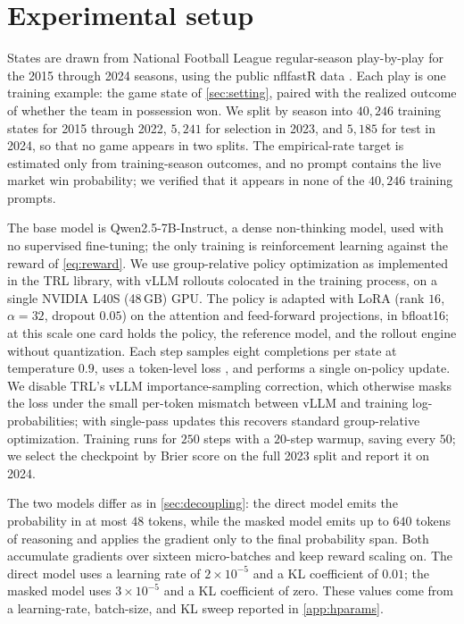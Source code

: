 \section{Experimental setup}
\label{sec:setup}

States are drawn from National Football League regular-season play-by-play for the 2015 through 2024
seasons, using the public nflfastR data \citep{yurko2018, nflfastr}. Each play is one training
example: the game state of \cref{sec:setting}, paired with the realized outcome of whether the team in
possession won. We split by season into $40{,}246$ training states for 2015 through 2022,
$5{,}241$ for selection in 2023, and $5{,}185$ for test in 2024, so that no game appears in two splits.
The empirical-rate target is estimated only from training-season outcomes, and no prompt contains the
live market win probability; we verified that it appears in none of the $40{,}246$ training prompts.

The base model is Qwen2.5-7B-Instruct, a dense non-thinking model, used with no supervised fine-tuning;
the only training is reinforcement learning against the reward of \cref{eq:reward}. We use group-relative
policy optimization \citep{grpo} as implemented in the TRL library, with vLLM rollouts colocated in the
training process, on a single NVIDIA L40S (48\,GB) GPU. The policy is adapted with LoRA (rank $16$,
$\alpha=32$, dropout $0.05$) on the attention and feed-forward projections, in bfloat16; at this scale one
card holds the policy, the reference model, and the rollout engine without quantization. Each step
samples eight completions per state at temperature $0.9$, uses a token-level loss \citep{dapo}, and
performs a single on-policy update. We disable TRL's vLLM importance-sampling correction, which otherwise
masks the loss under the small per-token mismatch between vLLM and training log-probabilities; with
single-pass updates this recovers standard group-relative optimization. Training runs for $250$ steps
with a $20$-step warmup, saving every $50$; we select the checkpoint by Brier score on the full 2023
split and report it on 2024.

The two models differ as in \cref{sec:decoupling}: the direct model emits the probability in at most $48$
tokens, while the masked model emits up to $640$ tokens of reasoning and applies the gradient only to the
final probability span. Both accumulate gradients over sixteen micro-batches and keep reward scaling on.
The direct model uses a learning rate of $2\times10^{-5}$ and a KL coefficient of $0.01$; the masked model
uses $3\times10^{-5}$ and a KL coefficient of zero. These values come from a learning-rate, batch-size,
and KL sweep reported in \cref{app:hparams}.

